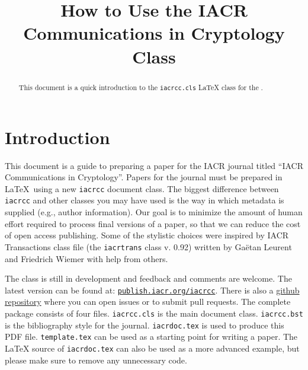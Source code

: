 \documentclass{iacrcc}
\title[running  = {The iacrcc class},
       onclick  = {https://publish.iacr.org/iacrcc},
       subtitle = {LaTeX Class Documentation (v0.2)},
      ]
      {How to Use the IACR Communications in Cryptology Class}
\affiliation[ror      = 031v4g827,
             onclick  = {https://www.nxp.com},
             street   = {Interleuvenlaan 80},
             city     = {Leuven},
             postcode = {3001},
             country  = {Belgium}
            ]{NXP Semiconductors}
\affiliation{Self}
\begin{document}
\maketitle


\begin{abstract}
  This document is a quick introduction to the \texttt{iacrcc.cls}
  \LaTeX{} class for the \publname{}.
\end{abstract}

\tableofcontents{}

\section*{Introduction}

This document is a guide to preparing a paper for the IACR journal
titled ``IACR Communications in Cryptology''.  Papers for the journal
must be prepared in \LaTeX\ using a new \texttt{iacrcc} document
class. The biggest difference between \texttt{iacrcc} and other
classes you may have used is the way in which metadata is supplied
(e.g., author information). Our goal is to minimize the amount of
human effort required to process final versions of a paper, so that we
can reduce the cost of open access publishing.  Some of the stylistic
choices were inspired by IACR Transactions class file (the
\texttt{iacrtrans} class v. 0.92) written by Ga{\"e}tan Leurent and
Friedrich Wiemer with help from others.

The class is still in development and feedback and comments are
welcome.  The latest version can be found at:
\href{https://publish.iacr.org/iacrcc}{\texttt{publish.iacr.org/iacrcc}}.
There is also a \href{https://github.com/IACR/latex}{github
  repository} where you can open issues or to submit pull requests.
The complete package consists of four files. \texttt{iacrcc.cls} is
the main document class. \texttt{iacrcc.bst} is the bibliography style
for the journal.  \texttt{iacrdoc.tex} is used to produce this PDF
file. \texttt{template.tex} can be used as a starting point for
writing a paper.  The \LaTeX{} source of \texttt{iacrdoc.tex} can also
be used as a more advanced example, but please make sure to remove any
unnecessary code.
\end{document}
